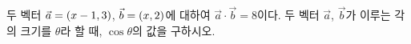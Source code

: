 두 벡터 $\vec{a}=(x-1{,}\mkern3mu\mathopen{}3)$, $\vec{b}=(x{,}\mkern3mu\mathopen{}2)$에 대하여 $\vec{a}\cdot\vec{b}=8$이다. 두 벡터 $\vec{a}$, $\vec{b}$가 이루는 각의 크기를 $\theta$라 할 때, $\cos\theta$의 값을 구하시오. 

